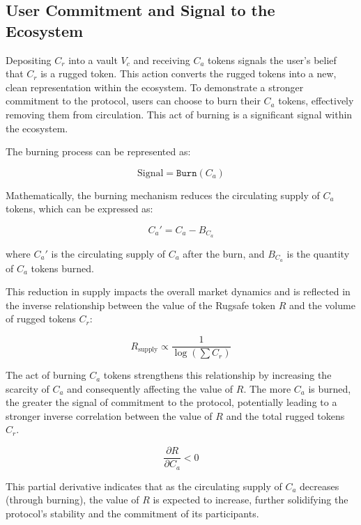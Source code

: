 \documentclass{article}
\begin{document}




\subsection{User Commitment and Signal to the Ecosystem}

Depositing $C_r$ into a vault $V_c$ and receiving $C_a$ tokens signals the user's belief that $C_r$ is a rugged token. This action converts the rugged tokens into a new, clean representation within the ecosystem. To demonstrate a stronger commitment to the protocol, users can choose to burn their $C_a$ tokens, effectively removing them from circulation. This act of burning is a significant signal within the ecosystem.

The burning process can be represented as:

\[
\text{Signal} = \texttt{Burn}(C_a)
\]

Mathematically, the burning mechanism reduces the circulating supply of $C_a$ tokens, which can be expressed as:

\[
C_a' = C_a - B_{C_a}
\]

where \(C_a'\) is the circulating supply of $C_a$ after the burn, and \(B_{C_a}\) is the quantity of $C_a$ tokens burned.

This reduction in supply impacts the overall market dynamics and is reflected in the inverse relationship between the value of the Rugsafe token $R$ and the volume of rugged tokens $C_r$:

\[
R_\text{supply}  \propto \frac{1}{\log\left(\sum C_r \right)}
\]

The act of burning $C_a$ tokens strengthens this relationship by increasing the scarcity of $C_a$ and consequently affecting the value of $R$. The more $C_a$ is burned, the greater the signal of commitment to the protocol, potentially leading to a stronger inverse correlation between the value of $R$ and the total rugged tokens $C_r$.

\[
\frac{\partial R}{\partial C_a} < 0
\]

This partial derivative indicates that as the circulating supply of $C_a$ decreases (through burning), the value of $R$ is expected to increase, further solidifying the protocol's stability and the commitment of its participants.




\end{document}
